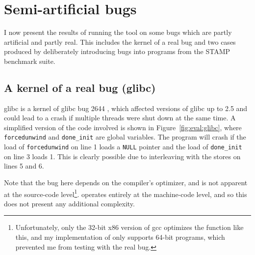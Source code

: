 \section{Semi-artificial bugs}
\label{sect:eval:semiartificial}

I now present the results of running the tool on some bugs which are
partly artificial and partly real.  This includes the kernel of a real
bug and two cases produced by deliberately introducing bugs into
programs from the STAMP benchmark suite\needCite{}.

\subsection{A kernel of a real bug (glibc)}
\label{sect:eval:glibc}


glibc is a kernel of glibc bug 2644 \cite{Cambell2006}, which
affected versions of glibc up to 2.5 and could lead to a crash if
multiple threads were shut down at the same time.  A simplified
version of the code involved is shown in Figure~\ref{fig:eval:glibc},
where \texttt{forcedunwind} and \texttt{done\_init} are global
variables.  The program will crash if the load of
\texttt{forcedunwind} on line 1 loads a \texttt{NULL} pointer and the
load of \texttt{done\_init} on line 3 loads 1.  This is clearly
possible due to interleaving with the stores on lines 5 and 6.

Note that the bug here depends on the compiler's optimizer, and is not
apparent at the source-code level\footnote{Unfortunately, only the
  32-bit x86 version of gcc optimizes the function like this, and my
  implementation of {\technique} only supports 64-bit programs, which
  prevented me from testing with the real bug.}.  {\Technique}
operates entirely at the machine-code level, and so this does not
present any additional complexity.

